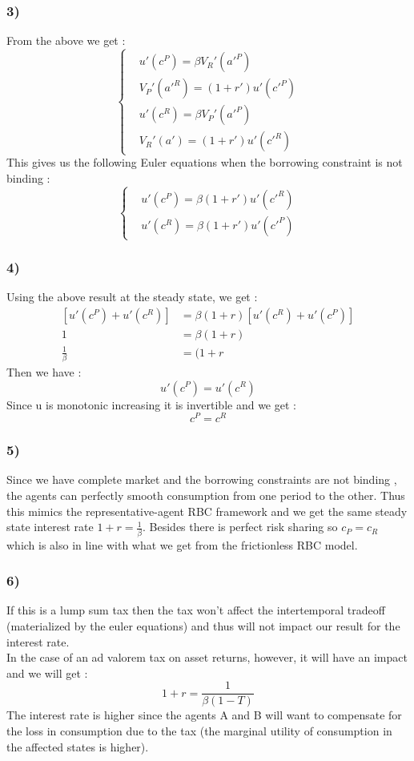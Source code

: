 \documentclass{article}
\begin{document}
\subsubsection{3)}
From the above we get : 
$$\left\{\begin{aligned}
    &u'(c^P)=\beta V_R'(a'^P)\\
    &V_P'(a'^R)=(1+r')u'(c'^P)\\
    &u'(c^R)=\beta V_P'(a'^P)\\
    &V_R'(a')=(1+r')u'(c'^R)
\end{aligned} \right.$$
This gives us the following Euler equations when the borrowing constraint is not binding : 
$$\left\{\begin{aligned}
    &u'(c^P)=\beta (1+r')u'(c'^R)\\
    & u'(c^R)=\beta (1+r')u'(c'^P)
\end{aligned} \right.$$
\subsubsection{4)}
Using the above result at the steady state, we get : 
$$\begin{aligned}
    [u'(c^P)+u'(c^R)] &=\beta (1+r) [u'(c^R)+u'(c^P)]\\
    1 &= \beta(1+r)\\
    \frac{1}{\beta} &= (1+r
\end{aligned}$$
Then we have : 
$$u'(c^P)=u'(c^R)$$
Since u is monotonic increasing it is invertible and we get :
$$c^P=c^R$$

\subsubsection{5)}
Since we have complete market and the borrowing constraints are not binding , the agents can perfectly smooth consumption from one period to the other. Thus this mimics the representative-agent RBC framework and we get the same steady state interest rate $1+r=\frac{1}{\beta}$. Besides there is perfect risk sharing so $c_P=c_R$ which is also in line with what we get from the frictionless RBC model.

\subsubsection{6)}
If this is a lump sum tax then the tax won't affect the intertemporal tradeoff (materialized by the euler equations) and thus will not impact our result for the interest rate. \\
In the case of an ad valorem tax on asset returns, however, it will have an impact and we will get : $$1+r = \frac{1}{\beta(1-T)}$$
The interest rate is higher since the agents A and B will want to compensate for the loss in consumption due to the tax (the marginal utility of consumption in the affected states is higher). 
\end{document}
